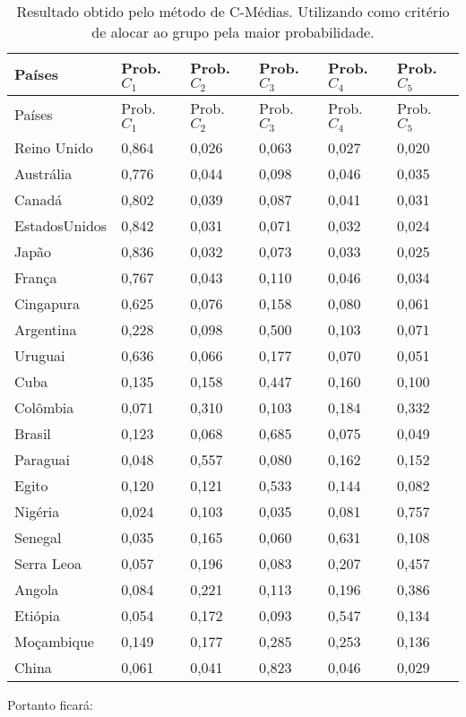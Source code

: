 \documentclass[
]{book}
\begin{document}
\begin{longtable}[]{@{}llllll@{}}
\caption{\label{tab:excmeans} Resultado obtido pelo método de C-Médias. Utilizando como critério de alocar ao grupo pela maior probabilidade.}\tabularnewline
\toprule
Países & Prob. \(C_1\) & Prob. \(C_2\) & Prob. \(C_3\) & Prob. \(C_4\) & Prob. \(C_5\)\tabularnewline
\midrule
\endfirsthead
\toprule
Países & Prob. \(C_1\) & Prob. \(C_2\) & Prob. \(C_3\) & Prob. \(C_4\) & Prob. \(C_5\)\tabularnewline
\midrule
\endhead
Reino Unido & 0,864 & 0,026 & 0,063 & 0,027 & 0,020\tabularnewline
Austrália & 0,776 & 0,044 & 0,098 & 0,046 & 0,035\tabularnewline
Canadá & 0,802 & 0,039 & 0,087 & 0,041 & 0,031\tabularnewline
EstadosUnidos & 0,842 & 0,031 & 0,071 & 0,032 & 0,024\tabularnewline
Japão & 0,836 & 0,032 & 0,073 & 0,033 & 0,025\tabularnewline
França & 0,767 & 0,043 & 0,110 & 0,046 & 0,034\tabularnewline
Cingapura & 0,625 & 0,076 & 0,158 & 0,080 & 0,061\tabularnewline
Argentina & 0,228 & 0,098 & 0,500 & 0,103 & 0,071\tabularnewline
Uruguai & 0,636 & 0,066 & 0,177 & 0,070 & 0,051\tabularnewline
Cuba & 0,135 & 0,158 & 0,447 & 0,160 & 0,100\tabularnewline
Colômbia & 0,071 & 0,310 & 0,103 & 0,184 & 0,332\tabularnewline
Brasil & 0,123 & 0,068 & 0,685 & 0,075 & 0,049\tabularnewline
Paraguai & 0,048 & 0,557 & 0,080 & 0,162 & 0,152\tabularnewline
Egito & 0,120 & 0,121 & 0,533 & 0,144 & 0,082\tabularnewline
Nigéria & 0,024 & 0,103 & 0,035 & 0,081 & 0,757\tabularnewline
Senegal & 0,035 & 0,165 & 0,060 & 0,631 & 0,108\tabularnewline
Serra Leoa & 0,057 & 0,196 & 0,083 & 0,207 & 0,457\tabularnewline
Angola & 0,084 & 0,221 & 0,113 & 0,196 & 0,386\tabularnewline
Etiópia & 0,054 & 0,172 & 0,093 & 0,547 & 0,134\tabularnewline
Moçambique & 0,149 & 0,177 & 0,285 & 0,253 & 0,136\tabularnewline
China & 0,061 & 0,041 & 0,823 & 0,046 & 0,029\tabularnewline
\bottomrule
\end{longtable}

Portanto ficará:
\end{document}

